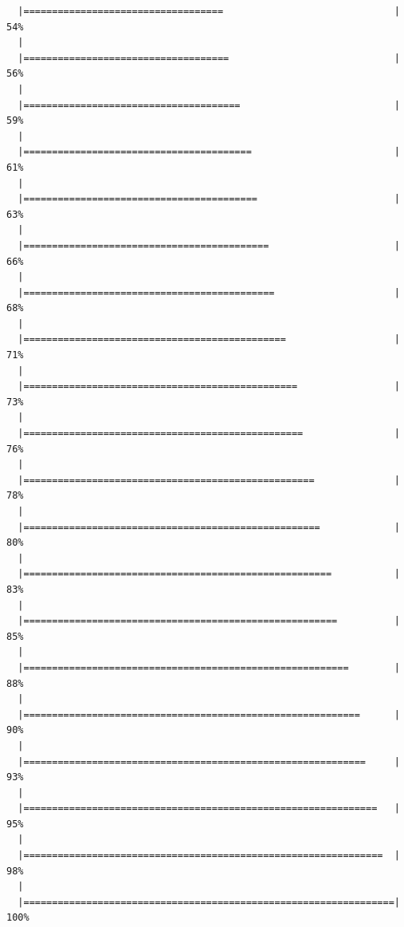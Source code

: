 \documentclass[]{article}
\begin{document}
\begin{verbatim}
  |===================================                              |  54%
  |                                                                       
  |====================================                             |  56%
  |                                                                       
  |======================================                           |  59%
  |                                                                       
  |========================================                         |  61%
  |                                                                       
  |=========================================                        |  63%
  |                                                                       
  |===========================================                      |  66%
  |                                                                       
  |============================================                     |  68%
  |                                                                       
  |==============================================                   |  71%
  |                                                                       
  |================================================                 |  73%
  |                                                                       
  |=================================================                |  76%
  |                                                                       
  |===================================================              |  78%
  |                                                                       
  |====================================================             |  80%
  |                                                                       
  |======================================================           |  83%
  |                                                                       
  |=======================================================          |  85%
  |                                                                       
  |=========================================================        |  88%
  |                                                                       
  |===========================================================      |  90%
  |                                                                       
  |============================================================     |  93%
  |                                                                       
  |==============================================================   |  95%
  |                                                                       
  |===============================================================  |  98%
  |                                                                       
  |=================================================================| 100%
\end{verbatim}
\end{document}
